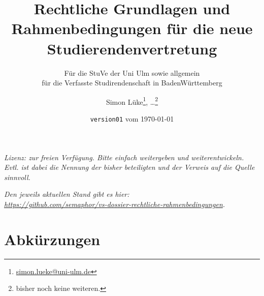\documentclass[
10pt,
a4paper,
twoside,								%
titlepage=false,							%
draft=false								%
]{scrartcl}
\begin{document}
\titlehead{\href{http://www.uni-ulm.de/stuve}{StuVe – StudierendenVertretung, uulm}}


\subject{}

\title{Rechtliche Grundlagen und Rahmenbedingungen für die neue Studierendenvertretung}

\subtitle{Für die StuVe der Uni Ulm sowie allgemein\\für die Verfasste Studirendenschaft in BadenWürttemberg}

\author{Simon Lüke\thanks{\href{mailto:simon.lueke@uni-ulm.de}{simon.lueke@uni-ulm.de}}, …\thanks{bisher noch keine weiteren.}}

\date{\texttt{version01} vom \today}


\maketitle
\thispagestyle{empty}

\tableofcontents

\vfill

\begin{center}
	\textit{Lizenz: zur freien Verfügung. Bitte einfach weitergeben und weiterentwickeln. Evtl. ist dabei die Nennung der bisher beteiligten und der Verweis auf die Quelle sinnvoll.}

	\textit{Den jeweils aktuellen Stand gibt es hier:\\
	\url{https://github.com/semaphor/vs-dossier-rechtliche-rahmenbedingungen}.}
\end{center}



\newpage
\thispagestyle{empty}

\section*{Abkürzungen}

\end{document}
